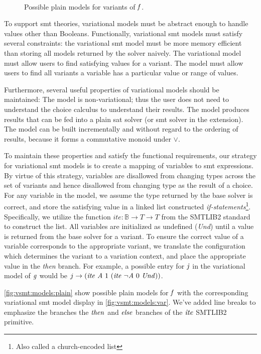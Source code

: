 ~\label{section:vsmt:models}
\begin{figure}[h]
    \centering
    \caption{Possible plain models for variants of $\mathit{f}$.}%
    \label{fig:vsmt:models:plain}
\end{figure}
To support \ac{smt} theories, variational models must be abstract enough to
handle values other than Booleans. Functionally, variational \ac{smt} models
must satisfy several constraints: the variational \ac{smt} model must be more
memory efficient than storing all models returned by the solver naively. The
variational model must allow users to find satisfying values for a variant. The
model must allow users to find all variants a variable has a particular value or
range of values.

Furthermore, several useful properties of variational models should be
maintained: The model is non-variational; thus the user does not need to
understand the choice calculus to understand their results. The model produces
results that can be fed into a plain \ac{sat} solver (or \ac{smt} solver in the
extension). The model can be built incrementally and without regard to the
ordering of results, because it forms a commutative monoid under $\vee$.

To maintain these properties and satisfy the functional requirements, our
strategy for variational \ac{smt} models is to create a mapping of variables to
\ac{smt} expressions. By virtue of this strategy, variables are disallowed from
changing types across the set of variants and hence disallowed from changing
type as the result of a choice. For any variable in the model, we assume the
type returned by the base solver is correct, and store the satisfying value in a
linked list constructed \emph{if-statements}\footnote{Also called a
  church-encoded list}. Specifically, we utilize the function $ite : \mathbb{B}
\rightarrow T \rightarrow T$ from the SMTLIB2 standard to construct the list.
All variables are initialized as undefined (\emph{Und}) until a value is
returned from the base solver for a variant. To ensure the correct value of a
variable corresponds to the appropriate variant, we translate the configuration
which determines the variant to a variation context, and place the appropriate
value in the \emph{then} branch. For example, a possible entry for $\mathit{j}$ in
the variational model of $\mathit{g}$ would be $j \rightarrow (\mathit{ite}\ \mathit{A}\ 1\
(\mathit{ite}\ \neg\mathit{A}\ 0\ \mathit{Und}))$.

\autoref{fig:vsmt:models:plain} show possible plain models for $\mathit{f}$ with the
corresponding variational \ac{smt} model display in
\autoref{fig:vsmt:models:var}. We've added line breaks to emphasize the branches
the $\mathit{then}$ and $\mathit{else}$ branches of the $\mathit{ite}$ SMTLIB2 primitive.

